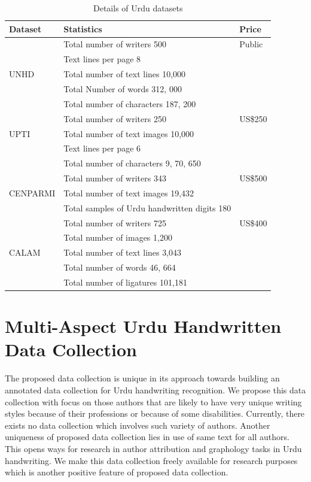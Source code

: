 \begin{table}[t]
\centering
\caption{Details of Urdu datasets}\label{tab6}
\begin{tabular}{@{}lll@{}}
\hline
Dataset	& Statistics & Price \\ \hline
& Total number of writers 500 & Public\\
& Text lines per page 8 & \\
UNHD \cite{15} & Total number of text lines 10,000 &\\
& Total Number of words 312, 000 &\\
& Total number of characters 187, 200 &\\ 
 \hline
& Total number of writers 250 & US\$250\\
UPTI\cite{21} & Total number of text images 10,000 \\
& Text lines per page 6 \\
& Total number of characters 9, 70, 650 &\\
\hline
& Total number of writers 343 & US\$500 \\
CENPARMI \cite{32} & Total number of text images 19,432 &  \\
& Total samples of Urdu handwritten digits 180 &\\
\hline
& Total number of writers 725 & US\$400\\
& Total number of images 1,200 &\\
CALAM \cite{58} & Total number of text lines 3,043  &\\
& Total number of words 46, 664 &\\
& Total number of ligatures 101,181 &\\
\hline
 \end{tabular}
\end{table}


\section{Multi-Aspect Urdu Handwritten Data Collection}
The proposed data collection is unique in its approach towards building an annotated data collection for Urdu handwriting recognition. We propose this data collection with focus on those authors that are likely to have very unique writing styles because of their professions or because of some disabilities. Currently, there exists no data collection which involves such variety of authors. Another uniqueness of proposed data collection lies in use of same text for all authors. This opens ways for research in author attribution and graphology tasks in Urdu handwriting. We make this data collection freely available for research purposes which is another positive feature of proposed data collection. 

